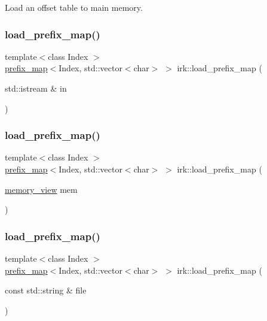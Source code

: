 Load an offset table to main memory. 

\mbox{\label{namespaceirk_af1497304f9dcf5e7b72fcd6a6b607c22}} 
\subsubsection{\texorpdfstring{load\+\_\+prefix\+\_\+map()}{load\_prefix\_map()}\hspace{0.1cm}{\footnotesize\ttfamily [1/3]}}
{\footnotesize\ttfamily template$<$class Index $>$ \\
\mbox{\hyperlink{classirk_1_1prefix__map}{prefix\+\_\+map}}$<$Index, std\+::vector$<$char$>$ $>$ irk\+::load\+\_\+prefix\+\_\+map (\begin{DoxyParamCaption}\item[{std\+::istream \&}]{in }\end{DoxyParamCaption})}

\mbox{\label{namespaceirk_aeae3542b21a20bf6ff0b48555d1be556}} 
\subsubsection{\texorpdfstring{load\+\_\+prefix\+\_\+map()}{load\_prefix\_map()}\hspace{0.1cm}{\footnotesize\ttfamily [2/3]}}
{\footnotesize\ttfamily template$<$class Index $>$ \\
\mbox{\hyperlink{classirk_1_1prefix__map}{prefix\+\_\+map}}$<$Index, std\+::vector$<$char$>$ $>$ irk\+::load\+\_\+prefix\+\_\+map (\begin{DoxyParamCaption}\item[{\mbox{\hyperlink{classirk_1_1memory__view}{memory\+\_\+view}}}]{mem }\end{DoxyParamCaption})}

\mbox{\label{namespaceirk_a42d3931cb977799b449703e53b5b893f}} 
\subsubsection{\texorpdfstring{load\+\_\+prefix\+\_\+map()}{load\_prefix\_map()}\hspace{0.1cm}{\footnotesize\ttfamily [3/3]}}
{\footnotesize\ttfamily template$<$class Index $>$ \\
\mbox{\hyperlink{classirk_1_1prefix__map}{prefix\+\_\+map}}$<$Index, std\+::vector$<$char$>$ $>$ irk\+::load\+\_\+prefix\+\_\+map (\begin{DoxyParamCaption}\item[{const std\+::string \&}]{file }\end{DoxyParamCaption})}

